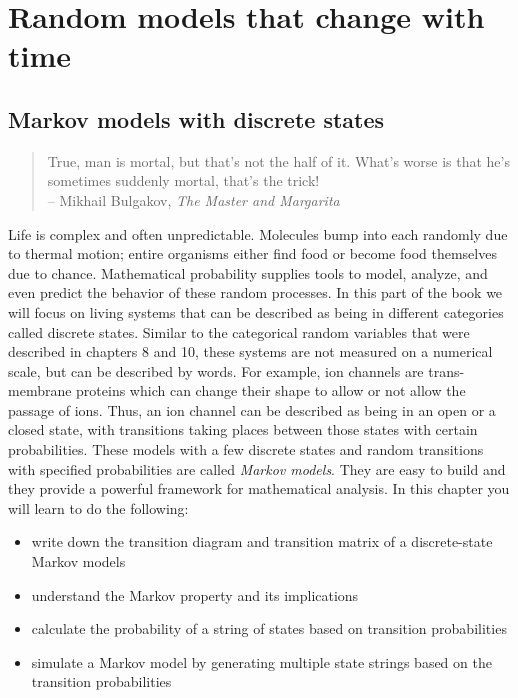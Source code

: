 \documentclass[
]{book}
\providecommand{\tightlist}{%
  \setlength{\itemsep}{0pt}\setlength{\parskip}{0pt}}
\theoremstyle{definition}
\theoremstyle{definition}
\theoremstyle{definition}
\theoremstyle{remark}
\begin{document}
\hypertarget{part-random-models-that-change-with-time}{%
\part{Random models that change with time}\label{part-random-models-that-change-with-time}}

\hypertarget{markov-models-with-discrete-states}{%
\chapter{Markov models with discrete states}\label{markov-models-with-discrete-states}}

\begin{quote}
True, man is mortal, but that's not the half of it. What's worse is that he's sometimes suddenly mortal, that's the trick!\\
-- Mikhail Bulgakov, \emph{The Master and Margarita}
\end{quote}

Life is complex and often unpredictable. Molecules bump into each randomly due to thermal motion; entire organisms either find food or become food themselves due to chance. Mathematical probability supplies tools to model, analyze, and even predict the behavior of these random processes. In this part of the book we will focus on living systems that can be described as being in different categories called discrete states. Similar to the categorical random variables that were described in chapters 8 and 10, these systems are not measured on a numerical scale, but can be described by words. For example, ion channels are trans-membrane proteins which can change their shape to allow or not allow the passage of ions. Thus, an ion channel can be described as being in an open or a closed state, with transitions taking places between those states with certain probabilities. These models with a few discrete states and random transitions with specified probabilities are called \emph{Markov models}. They are easy to build and they provide a powerful framework for mathematical analysis. In this chapter you will learn to do the following:

\begin{itemize}
\tightlist
\item
  write down the transition diagram and transition matrix of a discrete-state Markov models
\item
  understand the Markov property and its implications
\item
  calculate the probability of a string of states based on transition probabilities
\item
  simulate a Markov model by generating multiple state strings based on the transition probabilities
\end{itemize}
\end{document}
